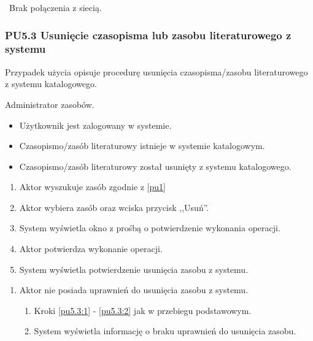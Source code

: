 \
Brak połączenia z siecią.

\subsubsection{PU5.3 Usunięcie czasopisma lub zasobu literaturowego z systemu}

Przypadek użycia opisuje procedurę usunięcia czasopisma/zasobu literaturowego z systemu katalogowego.

Administrator zasobów.

\begin{itemize}
\item Użytkownik jest zalogowany w systemie.
\item Czasopismo/zasób literaturowy istnieje w systemie katalogowym.
\end{itemize}

\begin{itemize}
\item Czasopismo/zasób literaturowy został usunięty z systemu katalogowego.
\end{itemize}

\begin{enumerate}
\item \label{pu5.3:1} Aktor wyszukuje zasób zgodnie z \ref{pu1}
\item \label{pu5.3:2} Aktor wybiera zasób oraz wciska przycisk ,,Usuń''.
\item System wyświetla okno z prośbą o potwierdzenie wykonania operacji.
\item Aktor potwierdza wykonanie operacji.
\item System wyświetla potwierdzenie usunięcia zasobu z systemu.
\end{enumerate}

\begin{enumerate}
\item Aktor nie posiada uprawnień do usunięcia zasobu z systemu.
	\begin{enumerate}[label*=\arabic*.]
		\item Kroki \ref{pu5.3:1} - \ref{pu5.3:2} jak w przebiegu podstawowym.
		\item System wyświetla informację o braku uprawnień do usunięcia zasobu.
	\end{enumerate}
\end{enumerate}

